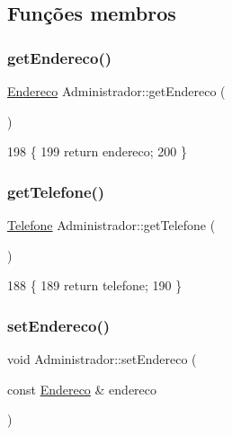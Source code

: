 \subsection{Funções membros}
\mbox{\label{class_administrador_a217b60a7f414efc581446eece222c6cf}} 
\subsubsection{\texorpdfstring{get\+Endereco()}{getEndereco()}}
{\footnotesize\ttfamily \mbox{\hyperlink{class_endereco}{Endereco}} Administrador\+::get\+Endereco (\begin{DoxyParamCaption}{ }\end{DoxyParamCaption})\hspace{0.3cm}{\ttfamily [inline]}}


\begin{DoxyCode}
198   \{
199     \textcolor{keywordflow}{return} endereco;
200   \}
\end{DoxyCode}
\mbox{\label{class_administrador_a2b7dddbf1e34a91a5f97c761332ce60b}} 
\subsubsection{\texorpdfstring{get\+Telefone()}{getTelefone()}}
{\footnotesize\ttfamily \mbox{\hyperlink{class_telefone}{Telefone}} Administrador\+::get\+Telefone (\begin{DoxyParamCaption}{ }\end{DoxyParamCaption})\hspace{0.3cm}{\ttfamily [inline]}}


\begin{DoxyCode}
188   \{
189     \textcolor{keywordflow}{return} telefone;
190   \}
\end{DoxyCode}
\mbox{\label{class_administrador_afe7a5d85ee5c6a43a56b1a47daff358e}} 
\subsubsection{\texorpdfstring{set\+Endereco()}{setEndereco()}}
{\footnotesize\ttfamily void Administrador\+::set\+Endereco (\begin{DoxyParamCaption}\item[{const \mbox{\hyperlink{class_endereco}{Endereco}} \&}]{endereco }\end{DoxyParamCaption})\hspace{0.3cm}{\ttfamily [inline]}}



